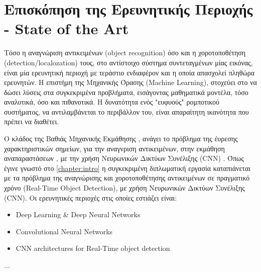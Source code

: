 \chapter{Επισκόπηση της Ερευνητικής Περιοχής - State of the Art}
\label{chapter:sota}
Τόσο η αναγνώριση αντικειμένων (object recognition) όσο και η χοροτοποθέτηση (detection/localozation) τους,
στο αντίστοιχο σύστημα συντεταγμένων μίας εικόνας, είναι μία ερευνητική περιοχή με τεράστιο ενδιαφέρον και η οποία
απασχολεί πληθώρα ερευνητών. Η επιστήμη της Μηχανικής Όρασης (Machine Learning), στοχεύει στο να δώσει λύσεις
στα συγκεκριμένα προβλήματα, εισάγοντας μαθηματικά μοντέλα, τόσο αναλυτικά, όσο και πιθανοτικά.
Η δυνατότητα ενός "ευφυούς" ρομποτικού συστήματος, να αντιλαμβάνεται
το περιβάλλον του, είναι απαραίτητη ικανότητα που πρέπει να διαθέτει.

O κλάδος της Βαθιάς Μηχανικής Εκμάθησης \cite{Goodfellow-et-al-2016-Book},
ανάγει το πρόβλημα της έυρεσης χαρακτηριστικών σημείων, για την αναγνριση αντικειμένων,
στην εκμάθηση αναπαραστάσεων \cite{bengio2013representation}, με την χρήση Νευρωνικών Δικτύων Συνέλιξης (CNN) \cite{}.
Όπως έγινε γνωστό στο \autoref{chapter:intro} η συγκεκριμένη διπλωματική εργασία
καταπιάνεται με τα πρόβλημα της αναγνώρισης και χοροτοποθέτησης αντικειμένων σε πραγματικό χρόνο (Real-Time Object Detection), με χρήση Νευρωνικών Δικτύων Συνέλιξης (CNN).
Οι ερευνητικές περιοχές στις οποίες εστιάζει είναι:

\begin{itemize}
  \item{Deep Learning \& Deep Neural Networks}
  \item{Convolutional Neural Networks}
  \item{CNN architectures for Real-Time object detection}
\end{itemize}
...

%
%
